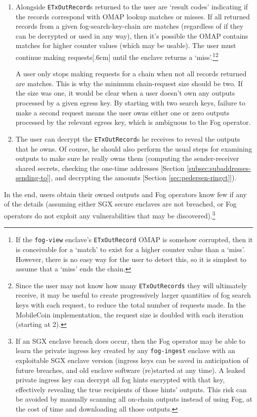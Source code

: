 \begin{enumerate}
    \item Alongside {\tt ETxOutRecord}s returned to the user are `result codes' indicating if the records correspond with OMAP lookup matches or misses. If all returned records from a given fog-search-key-chain are matches (regardless of if they can be decrypted or used in any way), then it's possible the OMAP contains matches for higher counter values (which may be usable). The user must continue making requests[.6cm] until the enclave returns a `miss'.\footnote{If the {\tt fog-view} enclave's {\tt ETxOutRecord} OMAP is somehow corrupted, then it is conceivable for a `match' to exist for a higher counter value than a `miss'. However, there is no easy way for the user to detect this, so it is simplest to assume that a `miss' ends the chain.}\footnote{Since the user may not know how many {\tt ETxOutRecords} they will ultimately receive, it may be useful to create progressively larger quantities of fog search keys with each request, to reduce the total number of requests made. In the MobileCoin implementation, the request size is doubled with each iteration (starting at 2).}

    A user only stops making requests for a chain when not all records returned are matches. This is why the minimum chain-request size should be two. If the size was one, it would be clear when a user doesn't own any outputs processed by a given egress key. By starting with two search keys, failure to make a second request means the user owns either one or zero outputs processed by the relevant egress key, which is ambiguous to the Fog operator.

    \item The user can decrypt the {\tt ETxOutRecord}s he receives to reveal the outputs that he owns. Of course, he should also perform the usual steps for examining outputs to make sure he really owns them (computing the sender-receiver shared secrets, checking the one-time addresses [Section \ref{subsec:subaddresses-sending-to}], and decrypting the amounts [Section \ref{sec:pedersen-ringct}]).
\end{enumerate}

In the end, users obtain their owned outputs and Fog operators know few if any of the details (assuming either SGX secure enclaves are not breached, or Fog operators do not exploit any vulnerabilities that may be discovered).\footnote{If an SGX enclave breach does occur, then the Fog operator may be able to learn the private ingress key created by any {\tt fog-ingest} enclave with an exploitable SGX enclave version (ingress keys can be saved in anticipation of future breaches, and old enclave software (re)started at any time). A leaked private ingress key can decrypt all fog hints encrypted with that key, effectively revealing the true recipients of those hints' outputs. This risk can be avoided by manually scanning all on-chain outputs instead of using Fog, at the cost of time and downloading all those outputs.}



